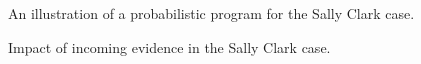 \documentclass[
  letterpaper,
  DIV=11,
  numbers=noendperiod]{scrartcl}
\begin{document}
\begin{figure}[h]


\caption{\label{fig-scwithhop}An illustration of a probabilistic program
for the Sally Clark case.}

\end{figure}%

\begin{figure}[H]


\caption{\label{fig-scwithhop2}Impact of incoming evidence in the Sally
Clark case.}

\end{figure}%
\end{document}
